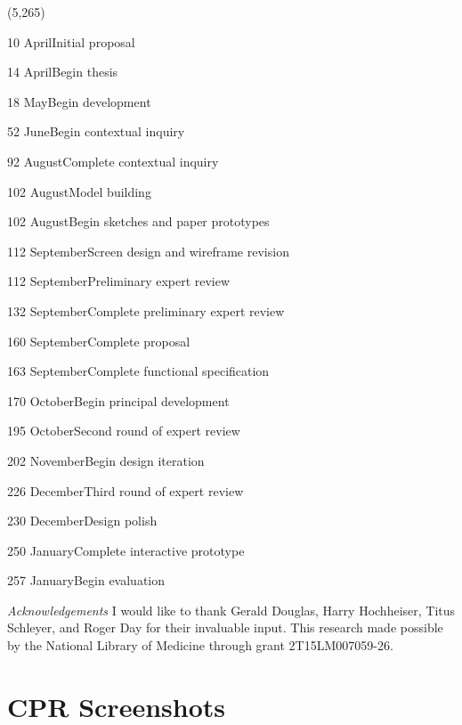 \documentclass[11pt]{article}
\begin{document}
\begin{timeline}{4.2in}(5,265)
\optrule
  \item[10]{April}{Initial proposal}
  \item[14]{April}{Begin thesis}
  \item[18]{May}{Begin development}
  \item[52]{June}{Begin contextual inquiry}
  \item[92]{August}{Complete contextual inquiry}
  \item[102]{August}{Model building}
  \item[102]{August}{Begin sketches and paper prototypes}
  \item[112]{September}{Screen design and wireframe revision}
  \item[112]{September}{Preliminary expert review}
  \item[132]{September}{Complete preliminary expert review}
  \item[160]{September}{Complete proposal}
  \item[163]{September}{Complete functional specification}
  \item[170]{October}{Begin principal development}
  \item[195]{October}{Second round of expert review}
  \item[202]{November}{Begin design iteration}
  \item[226]{December}{Third round of expert review}
  \item[230]{December}{Design polish}
  \item[250]{January}{Complete interactive prototype}
  \item[257]{January}{Begin evaluation}
\end{timeline}%

\vspace{20pt}

\noindent \textit{Acknowledgements} I would like to thank Gerald Douglas, Harry Hochheiser, Titus Schleyer, and Roger Day for their invaluable input. This research made possible by the National Library of Medicine through grant 2T15LM007059-26.
\newpage

\footnotesize{
}
\newpage

\appendix
\renewcommand\thesection{Appendix \Alph{section}}

\section{CPR Screenshots}
\label{SS}
\end{document}

